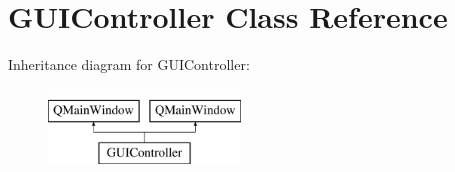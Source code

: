 \hypertarget{classGUIController}{\section{G\-U\-I\-Controller Class Reference}
\label{classGUIController}
}
Inheritance diagram for G\-U\-I\-Controller\-:\begin{figure}[H]
\begin{center}
\leavevmode
\includegraphics[height=2.000000cm]{classGUIController}
\end{center}
\end{figure}

